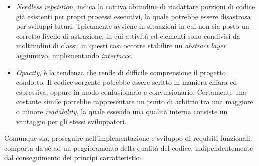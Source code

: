 \documentclass{article}
\begin{document}
\begin{itemize}[label={-}]
    \item \textit{Needless repetition}, indica la cattiva abitudine di riadattare porzioni di codice già esistenti per propri processi esecutivi, la quale potrebbe essere disastrosa per sviluppi futuri. Tpicamente avviene in situazioni in cui non sia posto un corretto livello di astrazione, in cui attività ed elementi sono condivisi da moltitudini di classi; in questi casi occorre stabilire un \textit{abstract layer} aggiuntivo, implementando \textit{interfacce}.
    \item \textit{Opacity}, è la tendenza che rende di difficile comprensione il progetto condotto. Il codice sorgente potrebbe essere scritto in maniera chiara ed espressiva, oppure in modo confusionario e convulsionario. Certamente una costante simile potrebbe rappresentare un punto di arbitrio tra una maggiore o minore \textit{readability}, la quale essendo una qualità interna consiste un vantaggio per gli stessi sviluppatori. 
\end{itemize}
Comunque sia, proseguire nell'implementazione e sviluppo di requisiti funzionali comporta da sè ad un peggioramento della qualità del codice, indipendentemente dal conseguimento dei principi carratteristici.
\end{document}
